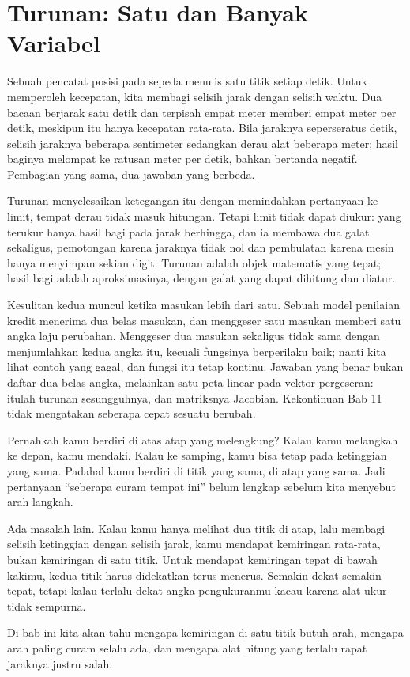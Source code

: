 \chapter{Turunan: Satu dan Banyak Variabel}

Sebuah pencatat posisi pada sepeda menulis satu titik setiap detik. Untuk memperoleh
kecepatan, kita membagi selisih jarak dengan selisih waktu. Dua bacaan berjarak satu detik
dan terpisah empat meter memberi empat meter per detik, meskipun itu hanya kecepatan
rata-rata. Bila jaraknya seperseratus detik, selisih jaraknya beberapa sentimeter sedangkan
derau alat beberapa meter; hasil baginya melompat ke ratusan meter per detik, bahkan bertanda
negatif. Pembagian yang sama, dua jawaban yang berbeda.

Turunan menyelesaikan ketegangan itu dengan memindahkan pertanyaan ke limit, tempat derau
tidak masuk hitungan. Tetapi limit tidak dapat diukur: yang terukur hanya hasil bagi pada
jarak berhingga, dan ia membawa dua galat sekaligus, pemotongan karena jaraknya tidak nol
dan pembulatan karena mesin hanya menyimpan sekian digit. Turunan adalah objek matematis
yang tepat; hasil bagi adalah aproksimasinya, dengan galat yang dapat dihitung dan diatur.

Kesulitan kedua muncul ketika masukan lebih dari satu. Sebuah model penilaian kredit
menerima dua belas masukan, dan menggeser satu masukan memberi satu angka laju perubahan.
Menggeser dua masukan sekaligus tidak sama dengan menjumlahkan kedua angka itu, kecuali
fungsinya berperilaku baik; nanti kita lihat contoh yang gagal, dan fungsi itu tetap
kontinu. Jawaban yang benar bukan daftar dua belas angka, melainkan satu peta linear pada vektor
pergeseran: itulah turunan sesungguhnya, dan matriksnya Jacobian. Kekontinuan Bab 11 tidak
mengatakan seberapa cepat sesuatu berubah.

\begin{untukanak}
Pernahkah kamu berdiri di atas atap yang melengkung? Kalau kamu melangkah ke depan, kamu
mendaki. Kalau ke samping, kamu bisa tetap pada ketinggian yang sama. Padahal kamu berdiri di
titik yang sama, di atap yang sama. Jadi pertanyaan ``seberapa curam tempat ini'' belum
lengkap sebelum kita menyebut arah langkah.

Ada masalah lain. Kalau kamu hanya melihat dua titik di atap, lalu membagi selisih ketinggian
dengan selisih jarak, kamu mendapat kemiringan rata-rata, bukan kemiringan di satu titik.
Untuk mendapat kemiringan tepat di bawah kakimu, kedua titik harus didekatkan terus-menerus.
Semakin dekat semakin tepat, tetapi kalau terlalu dekat angka pengukuranmu kacau karena alat
ukur tidak sempurna.

Di bab ini kita akan tahu mengapa kemiringan di satu titik butuh arah, mengapa arah paling
curam selalu ada, dan mengapa alat hitung yang terlalu rapat jaraknya justru salah.
\end{untukanak}

